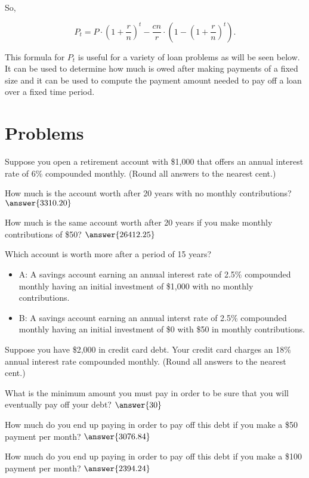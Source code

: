 \documentclass{ximera}
\begin{document}
So, 

\begin{fact}
  $$P_t = P\cdot\left(1+\frac{r}{n}\right)^t - \frac{cn}{r}\cdot\left(1-\left(1+\frac{r}{n}\right)^t\right).$$
\end{fact}

This formula for $P_t$ is useful for a variety of loan problems as will be seen below. It can be used to determine how much is owed after making payments of a fixed size and it can be used to compute the payment amount needed to pay off a loan over a fixed time period.

\section{Problems}

\begin{question}
Suppose you open a retirement account with \$1,000 that offers an annual interest rate of 6\% compounded monthly. (Round all answers to the nearest cent.)

How much is the account worth after 20 years with no monthly contributions? $\answer{3310.20}$

How much is the same account worth after 20 years if you make monthly contributions of \$50? $\answer{26412.25}$
\end{question}

\begin{question}
Which account is worth more after a period of 15 years?
\begin{itemize}
	\item A: A savings account earning an annual interest rate of 2.5\% compounded monthly having an initial investment of \$1,000 with no monthly contributions.
	\item B: A savings account earning an annual interst rate of 2.5\% compounded monthly having an initial investment of \$0 with \$50 in monthly contributions.
\end{itemize}
	\begin{multipleChoice}
	\end{multipleChoice}
\end{question}

\begin{question}
Suppose you have \$2,000 in credit card debt. Your credit card charges an 18\% annual interest rate compounded monthly. (Round all answers to the nearest cent.)

What is the minimum amount you must pay in order to be sure that you will eventually pay off your debt? $\answer{30}$

How much do you end up paying in order to pay off this debt if you make a \$50 payment per month? $\answer{3076.84}$

How much do you end up paying in order to pay off this debt if you make a \$100 payment per month? $\answer{2394.24}$
\end{question}
\end{document}

